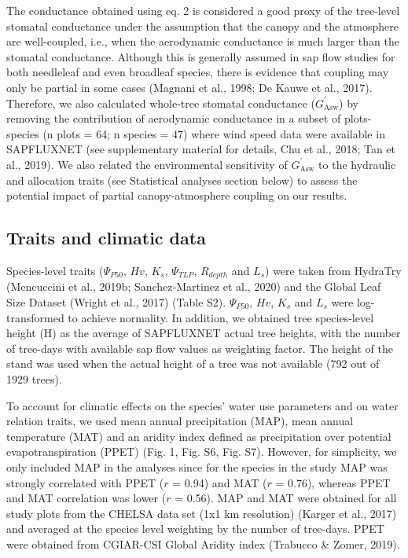 \documentclass[11pt,twoside]{reedthesis}
\begin{document}
The conductance obtained using eq. 2 is considered a good proxy of the
tree-level stomatal conductance under the assumption that the canopy and
the atmosphere are well-coupled, i.e., when the aerodynamic conductance
is much larger than the stomatal conductance. Although this is generally
assumed in sap flow studies for both needleleaf and even broadleaf
species, there is evidence that coupling may only be partial in some
cases (Magnani et al., 1998; De Kauwe et al., 2017). Therefore, we also
calculated whole-tree stomatal conductance (\(G_{\text{Asw}}^{'}\)) by
removing the contribution of aerodynamic conductance in a subset of
plots-species (n plots = 64; n species = 47) where wind speed data were
available in SAPFLUXNET (see supplementary material for details, Chu et
al., 2018; Tan et al., 2019). We also related the environmental
sensitivity of \(G_{\text{Asw}}^{'}\) to the hydraulic and allocation
traits (see Statistical analyses section below) to assess the potential
impact of partial canopy-atmosphere coupling on our results.\par

\subsection{Traits and climatic data}\label{traits-and-climatic-data}

Species-level traits (\textbar{}\(\Psi_{P50}\)\textbar{}, \(Hv\),
\(K_s\), \textbar{}\(\Psi_{TLP}\)\textbar{}, \(R_{depth}\) and \(L_s\))
were taken from HydraTry (Mencuccini et al., 2019b; Sanchez‐Martinez et
al., 2020) and the Global Leaf Size Dataset (Wright et al., 2017) (Table
S2). \textbar{}\(\Psi_{P50}\)\textbar{}, \(Hv\), \(K_s\) and \(L_s\)
were log-transformed to achieve normality. In addition, we obtained tree
species-level height (H) as the average of SAPFLUXNET actual tree
heights, with the number of tree-days with available sap flow values as
weighting factor. The height of the stand was used when the actual
height of a tree was not available (792 out of 1929 trees).\par

To account for climatic effects on the species' water use parameters and
on water relation traits, we used mean annual precipitation (MAP), mean
annual temperature (MAT) and an aridity index defined as precipitation
over potential evapotranspiration (PPET) (Fig. 1, Fig. S6, Fig. S7).
However, for simplicity, we only included MAP in the analyses since for
the species in the study MAP was strongly correlated with PPET (\(r\) =
0.94) and MAT (\(r\) = 0.76), whereas PPET and MAT correlation was lower
(\(r\) = 0.56). MAP and MAT were obtained for all study plots from the
CHELSA data set (1x1 km resolution) (Karger et al., 2017) and averaged
at the species level weighting by the number of tree-days. PPET were
obtained from CGIAR-CSI Global Aridity index (Trabucco \& Zomer,
2019).\par
\end{document}
